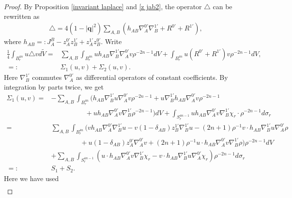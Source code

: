 \documentclass[a4paper,11pt]{amsart}
\numberwithin{equation}{section}
\begin{document}
\begin{proof}
By Proposition \ref{invariant laplace} and \eqref{z jab2}, the operator $\triangle$ can be rewritten as
\begin{equation}\begin{aligned}\label{rewritten laplcaian}
\triangle=4(1-|\mathbf{q}|^2)\sum_{A,B}\left(h_{AB}\nabla_{A}^{0'}\nabla_{B}^{1'}+R^{0'}+R^{1'}\right),
\end{aligned}\end{equation}
where $h_{AB}=:J_A^B-z_{A}^{0'}z_{B}^{1'}+z_{A}^{1'}z_{B}^{0'}$. Write
\begin{equation}\begin{aligned}\label{green pro}
\frac14\int_{B^{4n}_r}u\triangle vd\widetilde{V}
=&\sum_{A,B}\int_{B^{4n}_r}uh_{AB}\nabla_{B}^{1'}\nabla_{A}^{0'}v\rho^{-2n-1}dV+\int_{B^{4n}_r}u(R^{0'}+R^{1'})v\rho^{-2n-1}dV,\\
=:&\Sigma_1(u,v)+\Sigma_2(u,v).
\end{aligned}\end{equation}
Here $\nabla_{B}^{1'}$ commutes $\nabla_{A}^{0'}$ as differential operators of constant coefficients.
By integration by parts twice, we get
\begin{equation}\begin{aligned}\label{S1+S2}
\Sigma_1(u,v)
=&-\sum_{A,B}\int_{B^{4n}_r}\bigg(h_{AB}\nabla_{B}^{1'} u\nabla_{A}^{0'}v\rho^{-2n-1}+u\nabla_{B}^{1'}h_{AB}\nabla_{A}^{0'}v \rho^{-2n-1}\\
&\qquad\qquad\quad+uh_{AB}\nabla_{A}^{0'}v\nabla_{B}^{1'} \rho^{-2n-1}\bigg)dV+\int_{S^{4n-1}_r} uh_{AB}\nabla_{A}^{0'}v\nabla_{B}^{1'} \chi_r\cdot\rho^{-2n-1}d\sigma_r\\
=&\sum_{A,B}\int_{B^{4n}_r}\bigg(v h_{AB}\nabla_{A}^{0'}\nabla_{B}^{1'}u-v \left(1-\delta_{AB}\right) z_{B}^{1'}\nabla_{B}^{1'}u-(2n+1)\rho^{-1}v\cdot h_{AB}\nabla_{B}^{1'}u\nabla_{A}^{0'} \rho\\
&\qquad\qquad\;+ u \left(1-\delta_{AB} \right)z_{A}^{0'}\nabla_{A}^{0'}v+(2n+1)\rho^{-1}u\cdot h_{AB}\nabla_{A}^{0'}v\nabla_{B}^{1'} \rho\bigg)\rho^{-2n-1}dV\\
&+\sum_{A,B}\int_{S_r^{4n-1}} \left(u\cdot h_{AB}\nabla_{A}^{0'}v\nabla_{B}^{1'}\chi_r-v\cdot h_{AB}\nabla_{B}^{1'}u\nabla_{A}^{0'} \chi_r\right)\rho^{-2n-1}d\sigma_r\\
=:&S_1+S_2.
\end{aligned}\end{equation}
Here we have used
\begin{equation}\begin{aligned}

\end{aligned}
\end{equation}
\end{proof}
\end{document}
